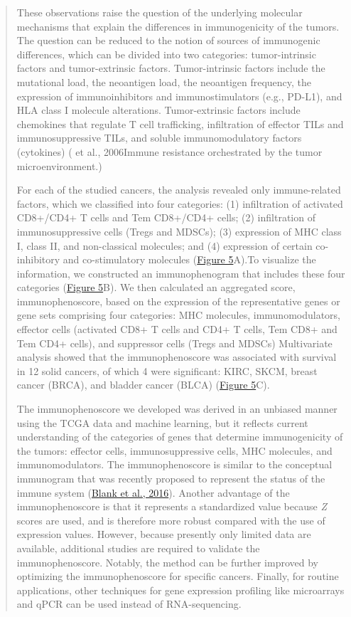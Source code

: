 \documentclass[12pt,]{book}
\theoremstyle{definition}
\theoremstyle{definition}
\theoremstyle{definition}
\theoremstyle{remark}
\begin{document}
\begin{quote}
These observations raise the question of the underlying molecular
mechanisms that explain the differences in immunogenicity of the tumors.
The question can be reduced to the notion of sources of immunogenic
differences, which can be divided into two categories: tumor-intrinsic
factors and tumor-extrinsic factors. Tumor-intrinsic factors include the
mutational load, the neoantigen load, the neoantigen frequency, the
expression of immunoinhibitors and immunostimulators (e.g., PD-L1), and
HLA class I molecule alterations. Tumor-extrinsic factors include
chemokines that regulate T cell trafficking, infiltration of effector
TILs and immunosuppressive TILs, and soluble immunomodulatory factors
(cytokines) (\citet{Gajewski} et al., 2006Immune resistance orchestrated
by the tumor microenvironment.)

For each of the studied cancers, the analysis revealed only
immune-related factors, which we classified into four categories: (1)
infiltration of activated CD8+/CD4+ T cells and Tem CD8+/CD4+ cells; (2)
infiltration of immunosuppressive cells (Tregs and MDSCs); (3)
expression of MHC class I, class II, and non-classical molecules; and
(4) expression of certain co-inhibitory and co-stimulatory molecules
(\href{http://www.cell.com/cms/attachment/2109515464/2082923785/gr5.jpg}{Figure
5}A).To visualize the information, we constructed an immunophenogram
that includes these four categories
(\href{http://www.cell.com/cms/attachment/2109515464/2082923785/gr5.jpg}{Figure
5}B). We then calculated an aggregated score, immunophenoscore, based on
the expression of the representative genes or gene sets comprising four
categories: MHC molecules, immunomodulators, effector cells (activated
CD8+ T cells and CD4+ T cells, Tem CD8+ and Tem CD4+ cells), and
suppressor cells (Tregs and MDSCs) Multivariate analysis showed that the
immunophenoscore was associated with survival in 12 solid cancers, of
which 4 were significant: KIRC, SKCM, breast cancer (BRCA), and bladder
cancer (BLCA)
(\href{http://www.cell.com/cms/attachment/2109515464/2082923785/gr5.jpg}{Figure
5}C).

The immunophenoscore we developed was derived in an unbiased manner
using the TCGA data and machine learning, but it reflects current
understanding of the categories of genes that determine immunogenicity
of the tumors: effector cells, immunosuppressive cells, MHC molecules,
and immunomodulators. The immunophenoscore is similar to the conceptual
immunogram that was recently proposed to represent the status of the
immune system (\href{javascript:void(0);}{Blank et al., 2016}). Another
advantage of the immunophenoscore is that it represents a standardized
value because \emph{Z} scores are used, and is therefore more robust
compared with the use of expression values. However, because presently
only limited data are available, additional studies are required to
validate the immunophenoscore. Notably, the method can be further
improved by optimizing the immunophenoscore for specific cancers.
Finally, for routine applications, other techniques for gene expression
profiling like microarrays and qPCR can be used instead of
RNA-sequencing.
\end{quote}
\end{document}
